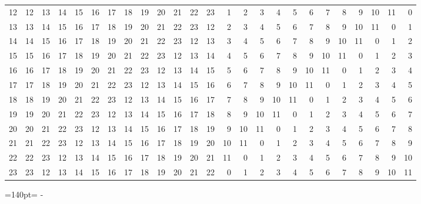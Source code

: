 \documentclass[10pt,a4paper]{article}
\newcommand{\needspace}[1]{\par\penalty-100\begingroup\dimen0=#1\relax\dimen2=\pagegoal
  \advance\dimen2-\pagetotal\ifdim\dimen0>\dimen2\relax\ifdim\dimen2>0pt\vfil\break\fi\fi
  \endgroup}
\numberwithin{equation}{section}
\begin{document}
{\begin{longtable}{@{}r|rrrrrrrrrrrrrrrrrrrrrrrr@{}}
12 & 12 & 13 & 14 & 15 & 16 & 17 & 18 & 19 & 20 & 21 & 22 & 23 & 1 & 2 & 3 & 4 & 5 & 6 & 7 & 8 & 9 & 10 & 11 & 0\\
13 & 13 & 14 & 15 & 16 & 17 & 18 & 19 & 20 & 21 & 22 & 23 & 12 & 2 & 3 & 4 & 5 & 6 & 7 & 8 & 9 & 10 & 11 & 0 & 1\\
14 & 14 & 15 & 16 & 17 & 18 & 19 & 20 & 21 & 22 & 23 & 12 & 13 & 3 & 4 & 5 & 6 & 7 & 8 & 9 & 10 & 11 & 0 & 1 & 2\\
15 & 15 & 16 & 17 & 18 & 19 & 20 & 21 & 22 & 23 & 12 & 13 & 14 & 4 & 5 & 6 & 7 & 8 & 9 & 10 & 11 & 0 & 1 & 2 & 3\\
16 & 16 & 17 & 18 & 19 & 20 & 21 & 22 & 23 & 12 & 13 & 14 & 15 & 5 & 6 & 7 & 8 & 9 & 10 & 11 & 0 & 1 & 2 & 3 & 4\\
17 & 17 & 18 & 19 & 20 & 21 & 22 & 23 & 12 & 13 & 14 & 15 & 16 & 6 & 7 & 8 & 9 & 10 & 11 & 0 & 1 & 2 & 3 & 4 & 5\\
18 & 18 & 19 & 20 & 21 & 22 & 23 & 12 & 13 & 14 & 15 & 16 & 17 & 7 & 8 & 9 & 10 & 11 & 0 & 1 & 2 & 3 & 4 & 5 & 6\\
19 & 19 & 20 & 21 & 22 & 23 & 12 & 13 & 14 & 15 & 16 & 17 & 18 & 8 & 9 & 10 & 11 & 0 & 1 & 2 & 3 & 4 & 5 & 6 & 7\\
20 & 20 & 21 & 22 & 23 & 12 & 13 & 14 & 15 & 16 & 17 & 18 & 19 & 9 & 10 & 11 & 0 & 1 & 2 & 3 & 4 & 5 & 6 & 7 & 8\\
21 & 21 & 22 & 23 & 12 & 13 & 14 & 15 & 16 & 17 & 18 & 19 & 20 & 10 & 11 & 0 & 1 & 2 & 3 & 4 & 5 & 6 & 7 & 8 & 9\\
22 & 22 & 23 & 12 & 13 & 14 & 15 & 16 & 17 & 18 & 19 & 20 & 21 & 11 & 0 & 1 & 2 & 3 & 4 & 5 & 6 & 7 & 8 & 9 & 10\\*
23 & 23 & 12 & 13 & 14 & 15 & 16 & 17 & 18 & 19 & 20 & 21 & 22 & 0 & 1 & 2 & 3 & 4 & 5 & 6 & 7 & 8 & 9 & 10 & 11\\
\bottomrule\end{longtable}}
\needspace{140pt}
\end{document}
